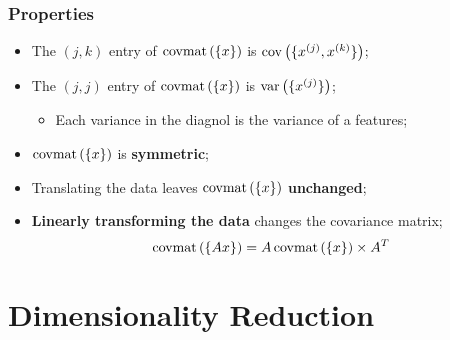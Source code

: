     \subsubsection{Properties}
      
      \begin{itemize}
        \item The $ \left( j, k \right) $ entry of $ \operatorname{covmat}\left( \{ x \} \right) $ is $ \operatorname{cov}\left( \{ x^{(j)}, x^{(k)} \} \right) $;
        \item The $ \left( j, j \right) $ entry of $ \operatorname{covmat}\left( \{ x \} \right) $ is $ \operatorname{var}\left( \{ x^{(j)} \} \right) $;
        \begin{itemize}
          \item Each variance in the diagnol is the variance of a features;
        \end{itemize}
        
        \item $ \operatorname{covmat}\left( \{ x \} \right) $ is \textbf{symmetric};
        \item Translating the data leaves $ \operatorname{covmat}\left( \{ x \} \right) $ \textbf{unchanged};
        \item \textbf{Linearly transforming the data} changes the covariance matrix;
        \begin{equation}\label{eq: ch10-effect-of-linear-transforming-matrix-on covariance-matrix}
          \operatorname{covmat}\left( \{ Ax \} \right) = A \operatorname{covmat}\left( \{ x \} \right) \times A^{T}
        \end{equation}
      \end{itemize}
    
\section{Dimensionality Reduction}

